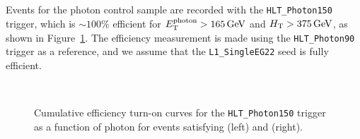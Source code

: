 Events for the photon control sample are recorded with the
\verb!HLT_Photon150! trigger, which is $\sim100\%$ efficient for
$E_{\rm T}^{\rm photon} > 165\,\text{Ge\hspace{-.08em}V}$ and $\mbox{$H_\text{T}$} > 375\,\text{Ge\hspace{-.08em}V}$, as shown
in Figure~\ref{fig:eff-photon}. The efficiency measurement is made
using the \verb!HLT_Photon90! trigger as a reference, and we assume
that the \verb!L1_SingleEG22! seed is fully efficient.

\begin{figure}[!h]
  \begin{center}
  \\     
    \caption{\label{fig:eff-photon}
    Cumulative efficiency turn-on curves for the \texttt{HLT\_Photon150} trigger 
    as a function of photon \pt for events satisfying \njetlow 
    (left) and \njethigh (right).} 
  \end{center}
\end{figure}


\FloatBarrier

